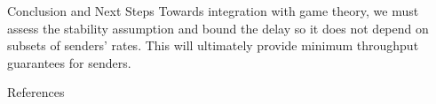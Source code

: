 \documentclass[final]{beamer}
\newlength{\sepwidth}
\newlength{\colwidth}
\newcommand{\separatorcolumn}{\begin{column}{\sepwidth}\end{column}}
\begin{document}
\begin{frame}[t]
\begin{columns}[t]
\begin{column}{\colwidth}
\begin{block}{Conclusion and Next Steps}
    Towards integration with game theory, we must assess the stability assumption and
    bound the delay so it does not depend on subsets of senders' rates. This will ultimately
    provide minimum throughput guarantees for senders.
  \end{block}
  \vspace{-6mm}

  \begin{block}{References}

    \nocite{*}
    \footnotesize{}

  \end{block}

\end{column}

\separatorcolumn
\end{columns}
\end{frame}
\end{document}
